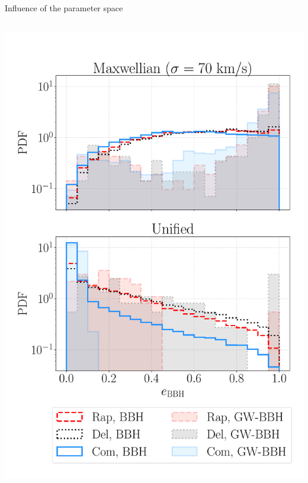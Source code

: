 \documentclass{beamer} %
\begin{document}
\begin{frame}[noframenumbering]{Influence of the parameter space}
\begin{columns}
\begin{column}{0.5\textwidth}
			\includegraphics[width=\textwidth]{./images/remeccentricity_beamer.pdf}
		\end{column}	
	\end{columns}
\end{frame}
\end{document}
